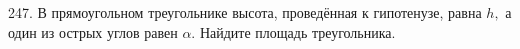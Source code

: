 247. В прямоугольном треугольнике высота, проведённая к гипотенузе, равна $h,$ а один из острых
углов равен $\alpha.$ Найдите площадь треугольника.\\
